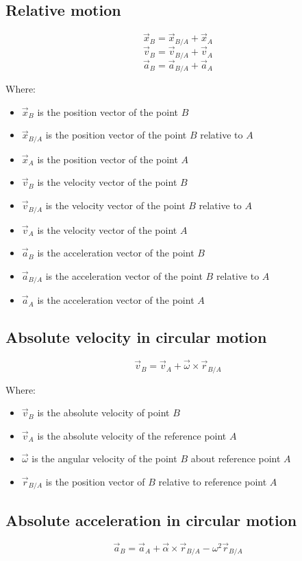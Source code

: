 \documentclass[11pt]{article}
\begin{document}
 \newpage

\subsection{Relative motion}
\label{sec:orgbdaa738}
\[\vec{x}_B = \vec{x}_{B/A} + \vec{x}_A\]
\[\vec{v}_B = \vec{v}_{B/A} + \vec{v}_A\]
\[\vec{a}_B = \vec{a}_{B/A} + \vec{a}_A\]

Where:
\begin{itemize}
\item \(\vec{x}_B\) is the position vector of the point \(B\)
\item \(\vec{x}_{B/A}\) is the position vector of the point \(B\) relative to \(A\)
\item \(\vec{x}_A\) is the position vector of the point \(A\)
\item \(\vec{v}_B\) is the velocity vector of the point \(B\)
\item \(\vec{v}_{B/A}\) is the velocity vector of the point \(B\) relative to \(A\)
\item \(\vec{v}_A\) is the velocity vector of the point \(A\)
\item \(\vec{a}_B\) is the acceleration vector of the point \(B\)
\item \(\vec{a}_{B/A}\) is the acceleration vector of the point \(B\) relative to \(A\)
\item \(\vec{a}_A\) is the acceleration vector of the point \(A\)
\end{itemize}

\subsection{Absolute velocity in circular motion}
\label{sec:org4633e0f}
\[\vec{v}_B = \vec{v}_A + \vec{\omega} \times \vec{r}_{B/A}\]

Where:
\begin{itemize}
\item \(\vec{v}_B\) is the absolute velocity of point \(B\)
\item \(\vec{v}_A\) is the absolute velocity of the reference point \(A\)
\item \(\vec{\omega}\) is the angular velocity of the point \(B\) about reference point \(A\)
\item \(\vec{r}_{B/A}\) is the position vector of \(B\) relative to reference point \(A\)
\end{itemize}

\subsection{Absolute acceleration in circular motion}
\label{sec:orge92c3fc}
\[\vec{a}_B = \vec{a}_A + \vec{\alpha} \times \vec{r}_{B/A} - \omega^2 \vec{r}_{B/A}\]
\end{document}
